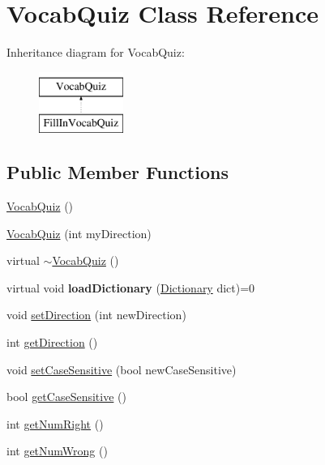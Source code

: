 \hypertarget{classVocabQuiz}{
\section{VocabQuiz Class Reference}
\label{classVocabQuiz}
}
Inheritance diagram for VocabQuiz:\begin{figure}[H]
\begin{center}
\leavevmode
\includegraphics[height=2cm]{classVocabQuiz}
\end{center}
\end{figure}
\subsection*{Public Member Functions}
\begin{DoxyCompactItemize}
\item 
\hyperlink{classVocabQuiz_aa9f188fd46b6bfd21c8e1e3d5883d350}{VocabQuiz} ()
\item 
\hyperlink{classVocabQuiz_a7c0575b4418431675956078c9b403166}{VocabQuiz} (int myDirection)
\item 
virtual \hyperlink{classVocabQuiz_a55c4c64161cc8e22643b0daa8dcf95a4}{$\sim$VocabQuiz} ()
\item 
\hypertarget{classVocabQuiz_af224c714b231d7ff4a8de770ce7280e3}{
virtual void {\bfseries loadDictionary} (\hyperlink{classDictionary}{Dictionary} dict)=0}
\label{classVocabQuiz_af224c714b231d7ff4a8de770ce7280e3}

\item 
void \hyperlink{classVocabQuiz_ac9714af01fec150cdbb9d01ab305ff61}{setDirection} (int newDirection)
\item 
int \hyperlink{classVocabQuiz_a2316cc4ecacdab87d631aabb50ecc2e5}{getDirection} ()
\item 
void \hyperlink{classVocabQuiz_ac858d591b947ad29f464280c995e1d08}{setCaseSensitive} (bool newCaseSensitive)
\item 
bool \hyperlink{classVocabQuiz_ad52db1bf5408be282cd76bbdd00c4ac2}{getCaseSensitive} ()
\item 
int \hyperlink{classVocabQuiz_a62a61345e1ff01acf56ba7e337e6c1fb}{getNumRight} ()
\item 
int \hyperlink{classVocabQuiz_a53b2eecb43a9ae1bc9d975a5e91d8ad6}{getNumWrong} ()
\end{DoxyCompactItemize}
